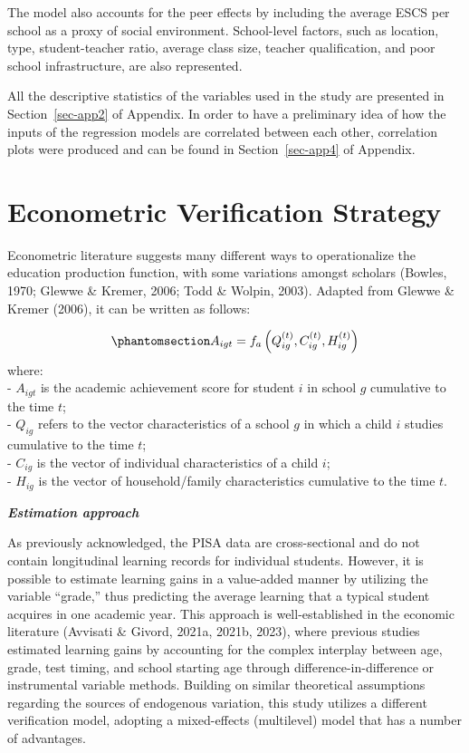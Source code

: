 \documentclass[
]{article}
\begin{document}
The model also accounts for the peer effects by including the average
ESCS per school as a proxy of social environment. School-level factors,
such as location, type, student-teacher ratio, average class size,
teacher qualification, and poor school infrastructure, are also
represented.

All the descriptive statistics of the variables used in the study are
presented in Section~\ref{sec-app2} of Appendix. In order to have a
preliminary idea of how the inputs of the regression models are
correlated between each other, correlation plots were produced and can
be found in Section~\ref{sec-app4} of Appendix.

\section{Econometric Verification
Strategy}\label{econometric-verification-strategy}

Econometric literature suggests many different ways to operationalize
the education production function, with some variations amongst scholars
(Bowles, 1970; Glewwe \& Kremer, 2006; Todd \& Wolpin, 2003). Adapted
from Glewwe \& Kremer (2006), it can be written as follows:

\begin{equation}\phantomsection\label{eq-eq1}{A_{igt} = f_a \left(Q^{(t)}_{ig}, C^{(t)}_{ig}, H^{(t)}_{ig}\right)  }\end{equation}
where:\\
- \(A_{igt}\) is the academic achievement score for student \(i\) in
school \(g\) cumulative to the time \(t\);\\
- \(Q_{ig}\) refers to the vector characteristics of a school \(g\) in
which a child \(i\) studies cumulative to the time \(t\);\\
- \(C_{ig}\) is the vector of individual characteristics of a child
\(i\);\\
- \(H_{ig}\) is the vector of household/family characteristics
cumulative to the time \(t\).

\textbf{\emph{Estimation approach}}

As previously acknowledged, the PISA data are cross-sectional and do not
contain longitudinal learning records for individual students. However,
it is possible to estimate learning gains in a value-added manner by
utilizing the variable ``grade,'' thus predicting the average learning
that a typical student acquires in one academic year. This approach is
well-established in the economic literature (Avvisati \& Givord, 2021a,
2021b, 2023), where previous studies estimated learning gains by
accounting for the complex interplay between age, grade, test timing,
and school starting age through difference-in-difference or instrumental
variable methods. Building on similar theoretical assumptions regarding
the sources of endogenous variation, this study utilizes a different
verification model, adopting a mixed-effects (multilevel) model that has
a number of advantages.
\end{document}
